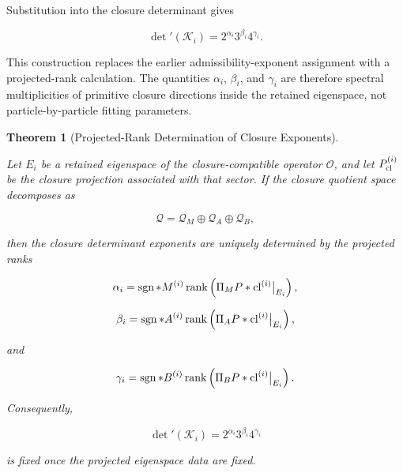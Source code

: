 \documentclass[11pt]{article}
\newtheorem{theorem}{Theorem}[section]
\theoremstyle{definition}
\theoremstyle{remark}
\begin{document}
Substitution into the closure determinant gives

\begin{equation}
\det{}'(\mathcal K_i) =
2^{\alpha_i}
3^{\beta_i}
4^{\gamma_i}.
\end{equation}

This construction replaces the earlier admissibility-exponent
assignment with a projected-rank calculation. The quantities
\(\alpha_i\), \(\beta_i\), and \(\gamma_i\) are therefore
spectral multiplicities of primitive closure directions inside
the retained eigenspace, not particle-by-particle fitting
parameters.

\begin{theorem}[Projected-Rank Determination of Closure Exponents]
\label{thm:projected_rank_exponents}

Let \(E_i\) be a retained eigenspace of the closure-compatible
operator \(\mathcal O\), and let \(P_{\rm cl}^{(i)}\) be the
closure projection associated with that sector. If the closure
quotient space decomposes as

\begin{equation}
\mathcal Q = 
\mathcal Q_M
\oplus
\mathcal Q_A
\oplus
\mathcal Q_B,
\end{equation}

then the closure determinant exponents are uniquely determined
by the projected ranks

\begin{equation}
\alpha_i =
\operatorname{sgn}*M^{(i)}
\operatorname{rank}
\left(
\Pi_M P*{\rm cl}^{(i)}
\big|_{E_i}
\right),
\end{equation}

\begin{equation}
\beta_i =
\operatorname{sgn}*A^{(i)}
\operatorname{rank}
\left(
\Pi_A P*{\rm cl}^{(i)}
\big|_{E_i}
\right),
\end{equation}

and

\begin{equation}
\gamma_i = \operatorname{sgn}*B^{(i)}
\operatorname{rank}
\left(
\Pi_B P*{\rm cl}^{(i)}
\big|_{E_i}
\right).
\end{equation}

Consequently,

\begin{equation}
\det{}'(\mathcal K_i) =
2^{\alpha_i}
3^{\beta_i}
4^{\gamma_i}
\end{equation}

is fixed once the projected eigenspace data are fixed.

\end{theorem}
\end{document}
